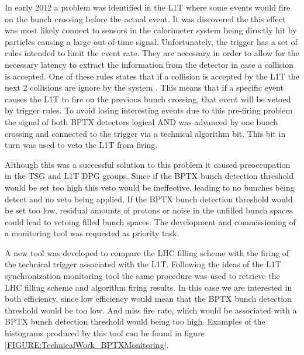 In early 2012 a problem was identified in the \gls{L1T} where some events would fire on the bunch crossing before the actual event. It was discovered the this effect was most likely connect to sensors in the calorimeter system being directly hit by particles causing a large out-of-time signal. Unfortunately, the trigger has a set of rules intended to limit the event rate. They are necessary in order to allow for the necessary latency to extract the information from the detector in case a collision is accepted. One of these rules states that if a collision is accepted by the \gls{L1T} the next 2 collisions are ignore by the system \cite{CMSTDR:CMSTridasTDRVol1}. This means that if a specific event causes the \gls{L1T} to fire on the previous bunch crossing, that event will be vetoed by trigger rules. To avoid losing interesting events due to this pre-firing problem the signal of both \gls{BPTX} detectors logical AND was advanced by one bunch crossing and connected to the trigger via a technical algorithm bit. This bit in turn was used to veto the \gls{L1T} from firing.

Although this was a successful solution to this problem it caused preoccupation in the \gls{TSG} and \gls{L1T} \gls{DPG} groups. Since if the \gls{BPTX} bunch detection threshold would be set too high this veto would be ineffective, leading to no bunches being detect and no veto being applied. If the \gls{BPTX} bunch detection threshold would be set too low, residual amounts of protons or noise in the unfilled bunch spaces could lead to vetoing filled bunch spaces. The development and commissioning of a monitoring tool was requested as priority task.

A new tool was developed to compare the \gls{LHC} filling scheme with the firing of the technical trigger associated with the \gls{L1T}. Following the ideas of the \gls{L1T} synchronization monitoring tool the same procedure was used to retrieve the \gls{LHC} filling scheme and algorithm firing results. In this case we are interested in both efficiency, since low efficiency would mean that the \gls{BPTX} bunch detection threshold would be too low. And miss fire rate, which would be associated with a \gls{BPTX} bunch detection threshold would being too high. Examples of the histograms produced by this tool can be found in figure \ref{FIGURE:TechnicalWork_BPTXMonitoring}.


